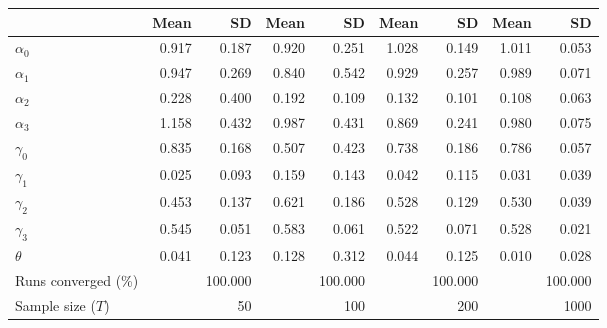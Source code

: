 
\begin{tabular}[t]{lrrrrrrrr}
\toprule
  & Mean & SD & Mean  & SD  & Mean   & SD   & Mean    & SD   \\
\midrule
$\alpha_{0}$ & 0.917 & 0.187 & 0.920 & 0.251 & 1.028 & 0.149 & 1.011 & 0.053\\
$\alpha_{1}$ & 0.947 & 0.269 & 0.840 & 0.542 & 0.929 & 0.257 & 0.989 & 0.071\\
$\alpha_{2}$ & 0.228 & 0.400 & 0.192 & 0.109 & 0.132 & 0.101 & 0.108 & 0.063\\
$\alpha_{3}$ & 1.158 & 0.432 & 0.987 & 0.431 & 0.869 & 0.241 & 0.980 & 0.075\\
$\gamma_{0}$ & 0.835 & 0.168 & 0.507 & 0.423 & 0.738 & 0.186 & 0.786 & 0.057\\
$\gamma_{1}$ & 0.025 & 0.093 & 0.159 & 0.143 & 0.042 & 0.115 & 0.031 & 0.039\\
$\gamma_{2}$ & 0.453 & 0.137 & 0.621 & 0.186 & 0.528 & 0.129 & 0.530 & 0.039\\
$\gamma_{3}$ & 0.545 & 0.051 & 0.583 & 0.061 & 0.522 & 0.071 & 0.528 & 0.021\\
$\theta$ & 0.041 & 0.123 & 0.128 & 0.312 & 0.044 & 0.125 & 0.010 & 0.028\\
Runs converged (\%) &  & 100.000 &  & 100.000 &  & 100.000 &  & 100.000\\
Sample size ($T$) &  & 50 &  & 100 &  & 200 &  & 1000\\
\bottomrule
\end{tabular}
